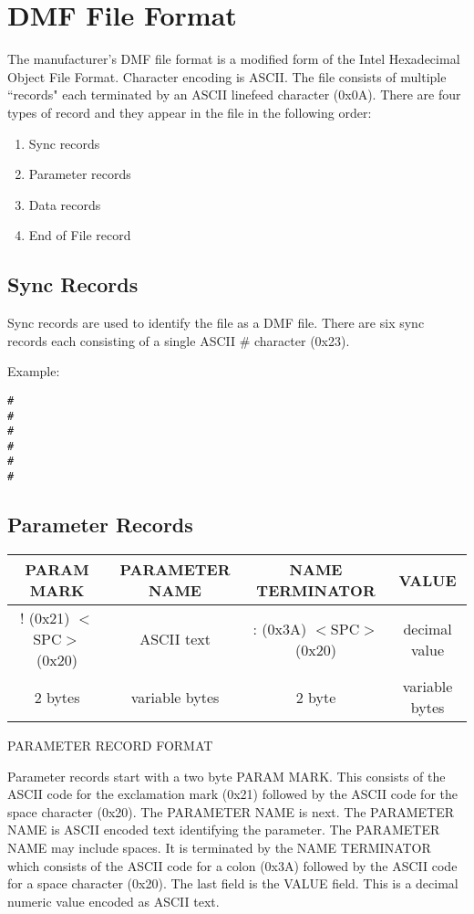 \section{DMF File Format}
 
The manufacturer's DMF file format is a modified form of the Intel Hexadecimal Object File Format. Character encoding is ASCII. The file consists of multiple ``records" each terminated by an ASCII linefeed character (0x0A). There are four types of record and they appear in the file in the following order:

\begin{enumerate}
\item Sync records
\item Parameter records
\item Data records
\item End of File record
\end{enumerate}

\subsection{Sync Records}
Sync records are used to identify the file as a DMF file. There are six sync records each consisting of a single ASCII \# character (0x23).

Example:

\begin{verbatim}
#
#
#
#
#
#
\end{verbatim}

\subsection{Parameter Records}

\begin{center}
\begin{tabular}{| c | c | c | c | }
\hline
PARAM MARK & PARAMETER NAME & NAME TERMINATOR & VALUE\\
\hline
! (0x21) $<$SPC$>$ (0x20) & ASCII text & : (0x3A) $<$SPC$>$ (0x20) & decimal value \\
\hline
2 bytes & variable bytes & 2 byte & variable bytes\\
\hline
\end{tabular}

PARAMETER RECORD FORMAT
\end{center}

Parameter records start with a two byte PARAM MARK. This consists of the ASCII code for the exclamation mark (0x21) followed by the ASCII code for the space character (0x20). The PARAMETER NAME is next. The PARAMETER NAME is ASCII encoded text identifying the parameter. The PARAMETER NAME may include spaces. It is terminated by the NAME TERMINATOR which consists of the ASCII code for a colon (0x3A) followed by the ASCII code for a space character (0x20). The last field is the VALUE field. This is a decimal numeric value encoded as ASCII text.

